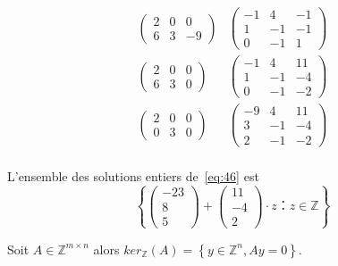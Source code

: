 \begin{example}
\begin{equation}
\begin{array}{cc}
\left(\begin{matrix}2 & 0 & 0\\6 & 3 & -9\end{matrix}\right) &
\left(\begin{matrix}-1 & 4 & -1\\1 & -1 & -1\\0 & -1 & 1\end{matrix}\right)\\

\left(\begin{matrix}2 & 0 & 0\\6 & 3 & 0\end{matrix}\right) &
\left(\begin{matrix}-1 & 4 & 11\\1 & -1 & -4\\0 & -1 & -2\end{matrix}\right)\\


\left(\begin{matrix}2 & 0 & 0\\0 & 3 & 0\end{matrix}\right) &
\left(\begin{matrix}-9 & 4 & 11\\3 & -1 & -4\\2 & -1 & -2\end{matrix}\right)\\
      \end{array}      
    \end{equation}

    L'ensemble des  solutions entiers de~\eqref{eq:46} est 
    \begin{displaymath}
      \left\{ \left(\begin{matrix}-23\\8\\5\end{matrix}\right) + \left(\begin{matrix}11\\-4\\2\end{matrix}\right) ⋅z ： z ∈ℤ\right\}
    \end{displaymath}
    
  \end{example}
  
  \begin{definition}
   \label{def:49}
   Soit $A \in \mathbb{Z}^{m \times n}$ alors $ker_{\mathbb{Z}}(A) = \left\{ y \in \mathbb{Z}^n, Ay=0 \right\}  $.
  \end{definition}
  
